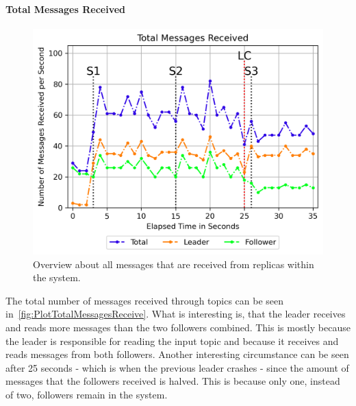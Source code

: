 \paragraph{Total Messages Received}

\begin{figure}[!htb]
	\centering
	\includegraphics[width=0.75\linewidth]{images/plots/TotalMessagesReceive}
	\caption{Overview about all messages that are received from replicas within the system.}
	\label{fig:PlotTotalMessagesReceive}
\end{figure}

The total number of messages received through  topics can be seen in~\autoref{fig:PlotTotalMessagesReceive}.
What is interesting is, that the leader receives and reads more messages than the two followers combined.
This is mostly because the leader is responsible for reading the input topic and because it receives and reads messages from both followers.
Another interesting circumstance can be seen after 25 seconds - which is when the previous leader crashes - since the amount of messages that the followers received is halved.
This is because only one, instead of two, followers remain in the system.



